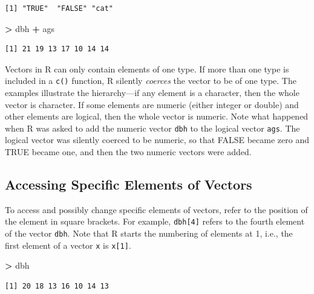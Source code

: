 \documentclass[]{krantz}
\makeatletter
\newenvironment{Shaded}{\begin{snugshade}}{\end{snugshade}}
\newcommand{\NormalTok}[1]{#1}
\newcommand{\OperatorTok}[1]{\textcolor[rgb]{0.43,0.43,0.43}{\textbf{#1}}}
\newcommand{\StringTok}[1]{\textcolor[rgb]{0.5,0.5,0.5}{#1}}
\newenvironment{kframe}{%
\medskip{}
\setlength{\fboxsep}{.8em}
 \def\at@end@of@kframe{}%
 \ifinner\ifhmode%
  \def\at@end@of@kframe{\end{minipage}}%
  \begin{minipage}{\columnwidth}%
 \fi\fi%
 \def\FrameCommand##1{\hskip\@totalleftmargin \hskip-\fboxsep
 \colorbox{shadecolor}{##1}\hskip-\fboxsep
     \hskip-\linewidth \hskip-\@totalleftmargin \hskip\columnwidth}%
 \MakeFramed {\advance\hsize-\width
   \@totalleftmargin\z@ \linewidth\hsize
   \@setminipage}}%
 {\par\unskip\endMakeFramed%
 \at@end@of@kframe}
\renewenvironment{Shaded}{\begin{kframe}}{\end{kframe}}
\makeatother
\begin{document}
\begin{verbatim}
[1] "TRUE"  "FALSE" "cat"  
\end{verbatim}

\begin{Shaded}
\begin{Highlighting}[]
\OperatorTok{>}\StringTok{ }\NormalTok{dbh }\OperatorTok{+}\StringTok{ }\NormalTok{ags}
\end{Highlighting}
\end{Shaded}

\begin{verbatim}
[1] 21 19 13 17 10 14 14
\end{verbatim}

Vectors in R can only contain elements of one type. If more than one type is included in a \texttt{c()} function, R silently \emph{coerces} the vector to be of one type. The examples illustrate the hierarchy---if any element is a character, then the whole vector is character. If some elements are numeric (either integer or double) and other elements are logical, then the whole vector is numeric. Note what happened when R was asked to add the numeric vector \texttt{dbh} to the logical vector \texttt{ags}. The logical vector was silently coerced to be numeric, so that FALSE became zero and TRUE became one, and then the two numeric vectors were added.

\hypertarget{accessing-specific-elements-of-vectors}{%
\subsection{Accessing Specific Elements of Vectors}\label{accessing-specific-elements-of-vectors}}

To access and possibly change specific elements of vectors, refer to the position of the element in square brackets. For example, \texttt{dbh{[}4{]}} refers to the fourth element of the vector \texttt{dbh}. Note that R starts the numbering of elements at 1, i.e., the first element of a vector \texttt{x} is \texttt{x{[}1{]}}.

\begin{Shaded}
\begin{Highlighting}[]
\OperatorTok{>}\StringTok{ }\NormalTok{dbh}
\end{Highlighting}
\end{Shaded}

\begin{verbatim}
[1] 20 18 13 16 10 14 13
\end{verbatim}
\end{document}
